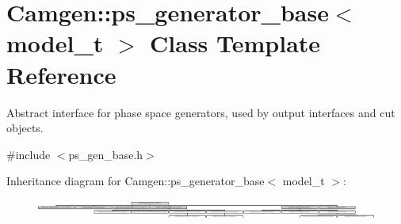 \hypertarget{a00451}{}\section{Camgen\+:\+:ps\+\_\+generator\+\_\+base$<$ model\+\_\+t $>$ Class Template Reference}
\label{a00451}


Abstract interface for phase space generators, used by output interfaces and cut objects.  




{\ttfamily \#include $<$ps\+\_\+gen\+\_\+base.\+h$>$}

Inheritance diagram for Camgen\+:\+:ps\+\_\+generator\+\_\+base$<$ model\+\_\+t $>$\+:\begin{figure}[H]
\begin{center}
\leavevmode
\includegraphics[height=0.643124cm]{a00451}
\end{center}
\end{figure}
